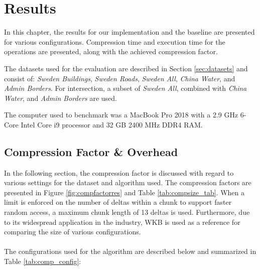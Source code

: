 \chapter{Results}
In this chapter, the results for our implementation and the baseline are presented for various configurations. Compression time and execution time for the operations are presented, along with the achieved compression factor. 

The datasets used for the evaluation are described in Section \ref{sec:datasets} and consist of: \emph{Sweden Buildings}, \textit{Sweden Roads}, \textit{Sweden All}, \textit{China Water}, and \textit{Admin Borders}. For intersection, a subset of \textit{Sweden All}, combined with \textit{China Water}, and \textit{Admin Borders} are used.

The computer used to benchmark was a MacBook Pro 2018 with a 2.9 GHz 6-Core Intel Core i9 processor and 32 GB 2400 MHz DDR4 RAM.

\section{Compression Factor \& Overhead}

In the following section, the compression factor is discussed with regard to various settings for the dataset and algorithm used. The compression factors are presented in Figure \ref{fig:compfactorres} and Table \ref{tab:compsize_tab}. When a limit is enforced on the number of deltas within a chunk to support faster random access, a maximum chunk length of 13 deltas is used. Furthermore, due to its widespread application in the industry, WKB is used as a reference for comparing the size of various configurations.
\\\\
The configurations used for the algorithm are described below and summarized in Table \ref{tab:comp_config}:

